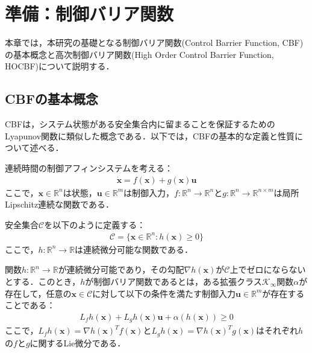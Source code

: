 \section{準備：制御バリア関数}

本章では，本研究の基礎となる制御バリア関数(Control Barrier Function, CBF)の基本概念と高次制御バリア関数(High Order Control Barrier Function, HOCBF)について説明する．

\subsection{CBFの基本概念}

CBFは，システム状態がある安全集合内に留まることを保証するためのLyapunov関数に類似した概念である．以下では，CBFの基本的な定義と性質について述べる．

連続時間の制御アフィンシステムを考える：
\begin{equation}
\begin{aligned}
\dot{\mathbf{x}} = f(\mathbf{x}) + g(\mathbf{x})\mathbf{u}
\label{eq:control_affine}
\end{aligned}
\end{equation}
ここで，$\mathbf{x} \in \mathbb{R}^n$は状態，$\mathbf{u} \in \mathbb{R}^m$は制御入力，$f: \mathbb{R}^n \rightarrow \mathbb{R}^n$と$g: \mathbb{R}^n \rightarrow \mathbb{R}^{n \times m}$は局所Lipschitz連続な関数である．

安全集合$\mathcal{C}$を以下のように定義する：
\begin{equation}
\begin{aligned}
\mathcal{C} = \{\mathbf{x} \in \mathbb{R}^n : h(\mathbf{x}) \geq 0\}
\label{eq:safe_set}
\end{aligned}
\end{equation}
ここで，$h: \mathbb{R}^n \rightarrow \mathbb{R}$は連続微分可能な関数である．

\begin{dfn}[制御バリア関数]
関数$h: \mathbb{R}^n \rightarrow \mathbb{R}$が連続微分可能であり，その勾配$\nabla h(\mathbf{x})$が$\mathcal{C}$上でゼロにならないとする．このとき，$h$が制御バリア関数であるとは，ある拡張クラス$\mathcal{K}_{\infty}$関数$\alpha$が存在して，任意の$\mathbf{x} \in \mathcal{C}$に対して以下の条件を満たす制御入力$\mathbf{u} \in \mathbb{R}^m$が存在することである：
\begin{equation}
\begin{aligned}
L_f h(\mathbf{x}) + L_g h(\mathbf{x})\mathbf{u} + \alpha(h(\mathbf{x})) \geq 0
\label{eq:cbf_condition}
\end{aligned}
\end{equation}
ここで，$L_f h(\mathbf{x}) = \nabla h(\mathbf{x})^T f(\mathbf{x})$と$L_g h(\mathbf{x}) = \nabla h(\mathbf{x})^T g(\mathbf{x})$はそれぞれ$h$の$f$と$g$に関するLie微分である．
\end{dfn}

